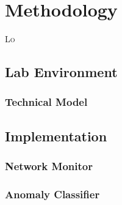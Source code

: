 \chapter{Methodology}
\label{chap:methodology}

\lettrine[lines=3, findent=3pt, nindent=0pt]{L}{o} \textcolor{dimgray}{\lipsum[1]}


\section{Lab Environment}
\label{sec:environment}

\textcolor{dimgray}{\lipsum}


\subsection{Technical Model}
\label{subsec:technical-model}

\textcolor{dimgray}{\lipsum}


\section{Implementation}
\label{sec:implemntation}

\textcolor{dimgray}{\lipsum}


\subsection{Network Monitor}
\label{subsec:monitor-implementation}

\textcolor{dimgray}{\lipsum}


\subsection{Anomaly Classifier}
\label{subsec:classifier-implementation}

